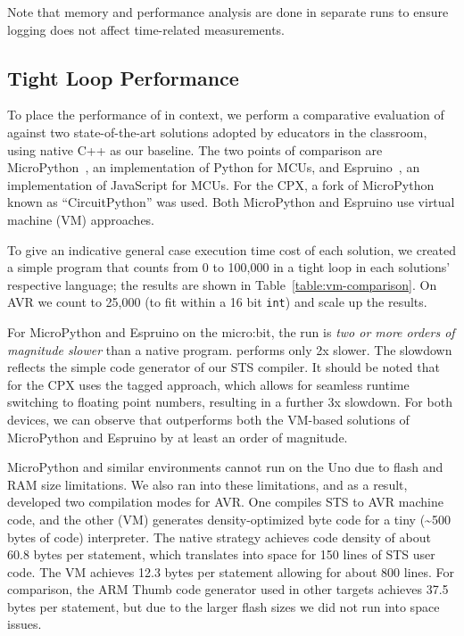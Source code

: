 Note that memory and performance analysis are done in separate runs
to ensure logging does not affect time-related measurements.

\subsection{Tight Loop Performance}

To place the performance of \MC in context, we perform a comparative evaluation of \MC against two state-of-the-art
solutions adopted by educators in the classroom, using native C++ as our baseline. The two points of comparison are MicroPython~\cite{MicroPython}, an implementation of Python for MCUs, and Espruino~\cite{espruinoBook}, an implementation of JavaScript for MCUs. For the CPX, a fork of MicroPython known as ``CircuitPython'' was used. Both MicroPython and Espruino use virtual machine (VM) approaches.

To give an indicative general case execution time cost of each solution, we created a simple program that counts from 0 to 100,000 in a tight loop in each solutions' respective language; the results are shown in Table~\ref{table:vm-comparison}. On AVR we count to 25,000 (to fit within a 16 bit \texttt{int}) and scale up the results.

For MicroPython and Espruino on the micro:bit, the run is \emph{two or more orders of magnitude slower} than a native \CO program.
\MC performs only 2x slower. The slowdown reflects the simple code generator of our STS compiler. It should be noted that \MC for the CPX uses the tagged approach, which allows for seamless runtime switching to floating point numbers, resulting in a further 3x slowdown. For both devices, we can observe that \MC outperforms both the VM-based solutions of MicroPython and Espruino by at least an order of magnitude.

MicroPython and similar environments cannot run on the Uno due to flash and RAM size limitations. We also ran into these limitations, and as a result, developed two compilation modes for AVR. One compiles STS to AVR machine code, and the other (\MC VM) generates density-optimized byte code for a tiny ({\textasciitilde}500 bytes of code) interpreter. The native strategy achieves code density of about 60.8 bytes per statement, which translates into space for 150 lines of STS user code. The VM achieves 12.3 bytes per statement allowing for about 800 lines. For comparison, the ARM Thumb code generator used in other targets achieves 37.5 bytes per statement, but due to the larger flash sizes we did not run into space issues.

